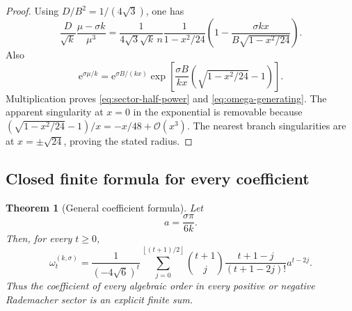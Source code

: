 \documentclass[11pt]{article}
\numberwithin{equation}{section}
\theoremstyle{mainthm}
\newtheorem{theorem}{Theorem}[section]
\theoremstyle{defstyle}
\theoremstyle{remark}
\newcommand{\e}{\mathrm e}
\newcommand{\cO}{\mathcal O}
\newcommand{\floor}[1]{\left\lfloor#1\right\rfloor}
\begin{document}
\begin{proof}
Using \(D/B^2=1/(4\sqrt3)\), one has
\[
 \frac{D}{\sqrt{k}}\frac{\mu-\sigma k}{\mu^3}
 =\frac{1}{4\sqrt3\sqrt{k}\,n}
 \frac1{1-x^2/24}
 \left(1-\frac{\sigma kx}{B\sqrt{1-x^2/24}}\right).
\]
Also
\[
 \e^{\sigma\mu/k}
 =\e^{\sigma B/(kx)}
 \exp\!\left[
 \frac{\sigma B}{kx}
 \left(\sqrt{1-x^2/24}-1\right)
 \right].
\]
Multiplication proves \eqref{eq:sector-half-power} and \eqref{eq:omega-generating}.  The apparent singularity at \(x=0\) in the exponential is removable because
\(
 (\sqrt{1-x^2/24}-1)/x=-x/48+\cO(x^3).
\)
The nearest branch singularities are at \(x=\pm\sqrt{24}\), proving the stated radius.
\end{proof}

\subsection{Closed finite formula for every coefficient}

\begin{theorem}[General coefficient formula]\label{thm:omega-closed}
Let
\begin{equation}\label{eq:a-k-sigma}
 a=\frac{\sigma\pi}{6k}.
\end{equation}
Then, for every \(t\ge0\),
\begin{equation}\label{eq:omega-closed}
 \boxed{
 \omega_t^{(k,\sigma)}=
 \frac{1}{(-4\sqrt6)^t}
 \sum_{j=0}^{\floor{(t+1)/2}}
 \binom{t+1}{j}
 \frac{t+1-j}{(t+1-2j)!}
 a^{t-2j}.}
\end{equation}
Thus the coefficient of every algebraic order in every positive or negative Rademacher sector is an explicit finite sum.
\end{theorem}
\end{document}
